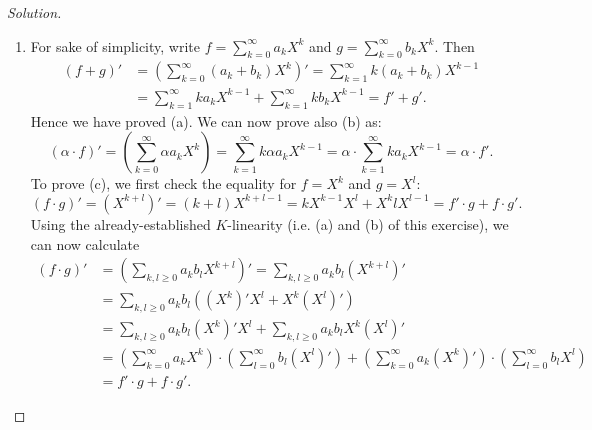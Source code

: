 \documentclass[a4paper,10pt,reqno]{amsart}
\newenvironment{sol}
  {\renewcommand\qedsymbol{$\blacksquare$}\begin{proof}[Solution]}
  {\end{proof}}
\begin{document}
\begin{sol}~
 \begin{enumerate}[label=(\roman*)]
        \item For sake of simplicity, write $f = \sum_{k=0}^{\infty} a_k X^k$ and $g = \sum_{k=0}^{\infty} b_kX^k$. Then
            \begin{align*}
            (f + g)' & 
            =  \left(\sum_{k=0}^{\infty} (a_k + b_k) X^k \right)' 
            = \sum_{k=1}^{\infty} k (a_k+b_k)X^{k-1} \\
            & = \sum_{k=1}^{\infty} ka_kX^{k-1} + \sum_{k=1}^{\infty} kb_kX^{k-1} = f' + g'.
        \end{align*}
        Hence we have proved (a).
        We can now prove also (b) as:
        \[
        (\alpha \cdot f)'
        = \left(\sum_{k=0}^{\infty} \alpha a_k X^k \right)
        = \sum_{k=1}^{\infty} k \alpha a_kX^{k-1} 
        = \alpha \cdot \sum_{k=1}^{\infty} k a_kX^{k-1}
        = \alpha \cdot f'.
        \]
        To prove (c), we first check the equality for $f = X^k$ and  $g = X^l$:
        \[
        (f \cdot g)' = (X^{k+l})' = (k+l)X^{k+l-1} = kX^{k-1}X^l + X^klX^{l-1} = f' \cdot g + f \cdot g'.
        \]
        Using the already-established $K$-linearity (i.e. (a) and (b) of this exercise), we can now calculate
        \begin{align*}
            (f \cdot g)' & 
            = \left( \sum_{k,l \geq 0} a_kb_l X^{k+l} \right)' 
            = \sum_{k,l \geq 0} a_kb_l (X^{k+l})'\\
            &= \sum_{k,l \geq 0} a_kb_l ((X^k)'X^l + X^k(X^l)') \\
            & = \sum_{k,l \geq 0} a_kb_l (X^k)'X^l  + \sum_{k,l \geq 0} a_kb_l X^k(X^l)' \\
            & = \left( \sum_{k=0}^{\infty} a_kX^k \right) \cdot \left( \sum_{l=0}^{\infty} b_l(X^l)' \right) + \left( \sum_{k=0}^{\infty} a_k(X^k)' \right) \cdot \left( \sum_{l=0}^{\infty} b_lX^l \right) \\
            & = f' \cdot g + f \cdot g'.
        \end{align*}


\end{enumerate}
\end{sol}
\end{document}
